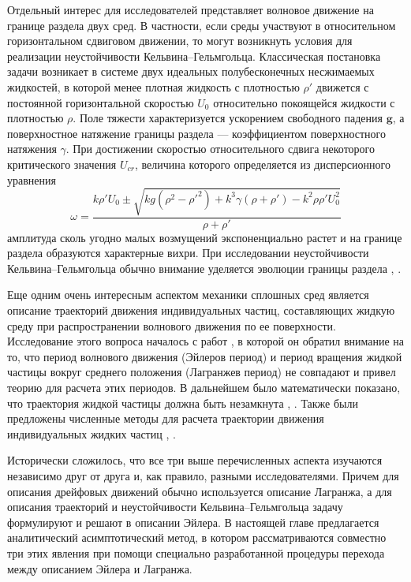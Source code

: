 Отдельный интерес для исследователей представляет волновое движение на границе раздела двух сред. В частности, если среды участвуют в относительном горизонтальном сдвиговом движении, то могут возникнуть условия для реализации неустойчивости Кельвина--Гельмгольца. Классическая постановка задачи возникает в системе двух идеальных полубесконечных несжимаемых жидкостей, в которой менее плотная жидкость с плотностью $ \rho ' $ движется с постоянной горизонтальной скоростью $ U_{0} $ относительно покоящейся жидкости с плотностью $ \rho $. Поле тяжести характеризуется ускорением свободного падения $ \mathbf{g} $, а поверхностное натяжение границы раздела --- коэффициентом поверхностного натяжения $ \gamma $. При достижении скоростью относительного сдвига некоторого критического значения $ U_{cr} $, величина которого определяется из дисперсионного уравнения
\begin{equation}
\omega=\dfrac{k \rho ' U_{0} \pm \sqrt{k g \left( \rho^{2} - \rho'^{2}\right) + k^{3} \gamma \left( \rho+ \rho' \right) - k^{2} \rho \rho' U_{0}^{2}}}{\rho+\rho'}
\label{DispUrKH}
\end{equation}
\noindent
амплитуда сколь угодно малых возмущений экспоненциально растет и на границе раздела образуются характерные вихри. При исследовании неустойчивости Кельвина--Гельмгольца обычно внимание уделяется эволюции границы раздела \parencite{Faber}, \parencite{Drazin}.

Еще одним очень интересным аспектом механики сплошных сред является описание траекторий движения индивидуальных частиц, составляющих жидкую среду при распространении волнового движения по ее поверхности. Исследование этого вопроса началось с работ \parencite{longuet1969transport}, в которой он обратил внимание на то, что период волнового движения (Эйлеров период) и период вращения жидкой частицы вокруг среднего положения (Лагранжев период) не совпадают и привел теорию для расчета этих периодов. В дальнейшем было математически показано, что траектория жидкой частицы должна быть незамкнута \parencite{henry2007particle}, \parencite{henry2007particle2}. Также были предложены численные методы для расчета траектории движения индивидуальных жидких частиц \parencite{chang2007particle}, \parencite{chang2009particle}.

Исторически сложилось, что все три выше перечисленных аспекта изучаются независимо друг от друга и, как правило, разными исследователями. Причем для описания дрейфовых движений обычно используется описание Лагранжа, а для описания траекторий и неустойчивости Кельвина--Гельмгольца задачу формулируют и решают в описании Эйлера. В настоящей главе предлагается аналитический асимптотический метод, в котором рассматриваются совместно три этих явления при помощи специально разработанной процедуры перехода между описанием Эйлера и Лагранжа.

